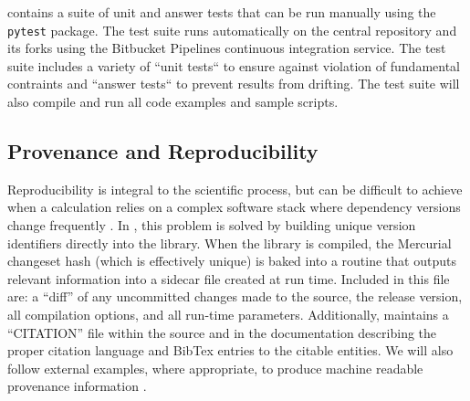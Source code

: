 \grackle{} contains a suite of unit and answer
tests that can be run manually using the \texttt{pytest} package.  The
test suite runs automatically on the central repository and its
forks using the Bitbucket Pipelines continuous integration service.
The test suite includes a variety of ``unit tests`` to ensure against
violation of fundamental contraints and ``answer tests`` to prevent
results from drifting. The test suite will also compile and
run all code examples and sample scripts.




\subsection{Provenance and Reproducibility}

Reproducibility is integral to the scientific process, but can be
difficult to achieve when a calculation relies on a complex software
stack where dependency versions change frequently
\citep{2014arXiv1412.5557J, 2016arXiv161009958L}.
In \grackle{}, this
problem is solved by building unique version identifiers directly
into the library.  When the library is compiled, the Mercurial
changeset hash (which is effectively unique) is baked into a routine
that outputs relevant information into a sidecar file created at run
time. Included in this file are: a ``diff'' of any uncommitted
changes made to the source, the release
version, all compilation options, and all run-time parameters.
Additionally, \grackle{} maintains a ``CITATION'' file within the
source and in the documentation describing the proper citation
language and BibTex entries to the citable entities.  We will also
follow external examples, where appropriate, to produce machine
readable provenance information \citep[e.g.,][]{force11,
  Fenner097196}.

